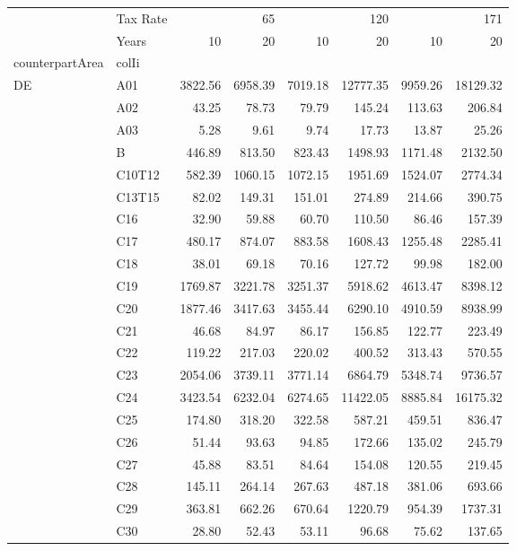 \begin{tabular}{llrrrrrr}
\toprule
 & Tax Rate & \multicolumn{2}{r}{65} & \multicolumn{2}{r}{120} & \multicolumn{2}{r}{171} \\
 & Years & 10 & 20 & 10 & 20 & 10 & 20 \\
counterpartArea & colIi &  &  &  &  &  &  \\
\midrule
\multirow[t]{64}{*}{DE} & A01 & 3822.56 & 6958.39 & 7019.18 & 12777.35 & 9959.26 & 18129.32 \\
 & A02 & 43.25 & 78.73 & 79.79 & 145.24 & 113.63 & 206.84 \\
 & A03 & 5.28 & 9.61 & 9.74 & 17.73 & 13.87 & 25.26 \\
 & B & 446.89 & 813.50 & 823.43 & 1498.93 & 1171.48 & 2132.50 \\
 & C10T12 & 582.39 & 1060.15 & 1072.15 & 1951.69 & 1524.07 & 2774.34 \\
 & C13T15 & 82.02 & 149.31 & 151.01 & 274.89 & 214.66 & 390.75 \\
 & C16 & 32.90 & 59.88 & 60.70 & 110.50 & 86.46 & 157.39 \\
 & C17 & 480.17 & 874.07 & 883.58 & 1608.43 & 1255.48 & 2285.41 \\
 & C18 & 38.01 & 69.18 & 70.16 & 127.72 & 99.98 & 182.00 \\
 & C19 & 1769.87 & 3221.78 & 3251.37 & 5918.62 & 4613.47 & 8398.12 \\
 & C20 & 1877.46 & 3417.63 & 3455.44 & 6290.10 & 4910.59 & 8938.99 \\
 & C21 & 46.68 & 84.97 & 86.17 & 156.85 & 122.77 & 223.49 \\
 & C22 & 119.22 & 217.03 & 220.02 & 400.52 & 313.43 & 570.55 \\
 & C23 & 2054.06 & 3739.11 & 3771.14 & 6864.79 & 5348.74 & 9736.57 \\
 & C24 & 3423.54 & 6232.04 & 6274.65 & 11422.05 & 8885.84 & 16175.32 \\
 & C25 & 174.80 & 318.20 & 322.58 & 587.21 & 459.51 & 836.47 \\
 & C26 & 51.44 & 93.63 & 94.85 & 172.66 & 135.02 & 245.79 \\
 & C27 & 45.88 & 83.51 & 84.64 & 154.08 & 120.55 & 219.45 \\
 & C28 & 145.11 & 264.14 & 267.63 & 487.18 & 381.06 & 693.66 \\
 & C29 & 363.81 & 662.26 & 670.64 & 1220.79 & 954.39 & 1737.31 \\
 & C30 & 28.80 & 52.43 & 53.11 & 96.68 & 75.62 & 137.65 \\

\end{tabular}
